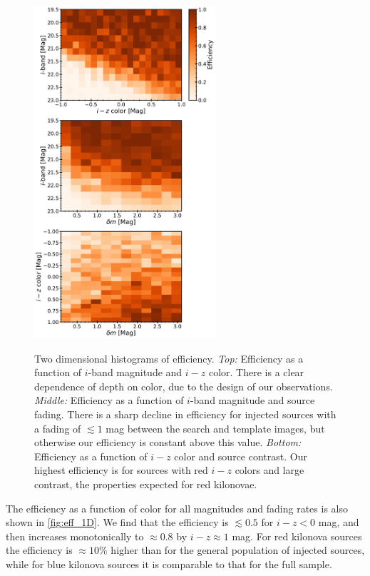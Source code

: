 \begin{figure}[!t]
\begin{center}
\hspace*{-0.1in} 
\scalebox{1.}
{\includegraphics[width=0.6\textwidth]{./figs/chapter3/f7.pdf}}
\caption{Two dimensional histograms of efficiency. {\it Top:} Efficiency as a function of $i$-band magnitude and $i-z$ color. There is a clear dependence of depth on color, due to the design of our observations. {\it Middle:} Efficiency as a function of $i$-band magnitude and source fading. There is a sharp decline in efficiency for injected sources with a fading of $\lesssim 1$ mag between the search and template images, but otherwise our efficiency is constant above this value. {\it Bottom:} Efficiency as a function of $i-z$ color and source contrast. Our highest efficiency is for sources with red $i-z$ colors and large contrast, the properties expected for red kilonovae.}
\label{fig:eff_2D}
\end{center}
\end{figure}

The efficiency as a function of color for all magnitudes and fading rates is also shown in \autoref{fig:eff_1D}. We find that the efficiency is $\lesssim 0.5$ for $i-z<0$ mag, and then increases monotonically to $\approx 0.8$ by $i-z\approx 1$ mag. For red kilonova sources the efficiency is $\approx10\%$ higher than for the general population of injected sources, while for blue kilonova sources it is comparable to that for the full sample.


